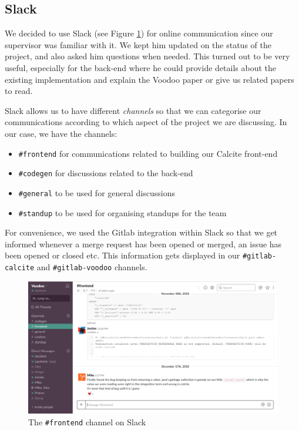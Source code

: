 \subsection{Slack}

We decided to use Slack (see Figure \ref{fig:slack}) for online communication since our supervisor was familiar with it.
We kept him updated on the status of the project, and also asked him questions when needed. This turned out to be very useful, especially for the back-end where he could provide details about the existing implementation and explain the Voodoo paper or give us related papers to read.

Slack allows us to have different \emph{channels} so that we can categorise our communications according to which aspect of the project we are discussing. In our case, we have the channels:

\begin{itemize}
    \item \texttt{\#frontend} for communications related to building our Calcite front-end
    \item \texttt{\#codegen} for discussions related to the back-end
    \item \texttt{\#general} to be used for general discussions
    \item \texttt{\#standup} to be used for organising standups for the team
\end{itemize}

For convenience, we used the Gitlab integration within Slack so that we get informed whenever a merge request has been opened or merged, an issue has been opened or closed etc. This information gets displayed in our \texttt{\#gitlab-calcite} and \texttt{\#gitlab-voodoo} channels.

\begin{figure}[h!]
    \centering
    \includegraphics[width=0.9\linewidth]{project-management/slack.png}
    \caption{The \texttt{\#frontend} channel on Slack}
    \label{fig:slack}
\end{figure}

